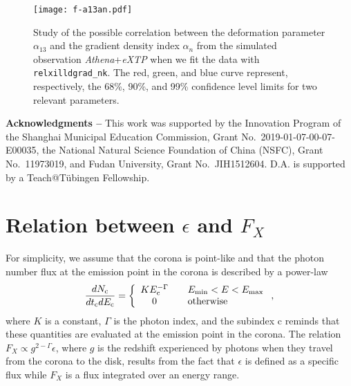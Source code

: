 \documentclass[twocolumn]{emulateapj}
\newcommand{\be}{\begin{eqnarray}}
\newcommand{\ee}{\end{eqnarray}}
\begin{document}
\begin{figure}
\begin{center}
\texttt{[image: f-a13an.pdf]}
\end{center}
\vspace{-0.5cm}
\caption{Study of the possible correlation between the deformation parameter $\alpha_{13}$ and the gradient density index $\alpha_n$ from the simulated observation \textsl{Athena}+\textsl{eXTP} when we fit the data with {\tt relxilldgrad\_nk}. The red, green, and blue curve represent, respectively, the 68\%, 90\%, and 99\% confidence level limits for two relevant parameters.}
\label{a13an}
\end{figure}








\vspace{0.5cm}


{\bf Acknowledgments --}
This work was supported by the Innovation Program of the Shanghai Municipal Education Commission, Grant No.~2019-01-07-00-07-E00035, the National Natural Science Foundation of China (NSFC), Grant No.~11973019, and Fudan University, Grant No.~JIH1512604. D.A. is supported by a Teach@T{\"ubingen} Fellowship.






\appendix

\section{Relation between $\epsilon$ and $F_X$}

For simplicity, we assume that the corona is point-like and that the photon number flux at the emission point in the corona is described by a power-law
\be\label{eq-corona}
\frac{dN_{\rm c}}{dt_{\rm c} dE_{\rm c}} = \left\{
\begin{array}{cl}
K E^{-\Gamma}_{\rm c} & \quad E_{\rm min} < E < E_{\rm max} \\
0 & \quad \text{otherwise}
\end{array} \right. ,
\ee
where $K$ is a constant, $\Gamma$ is the photon index, and the subindex c reminds that these quantities are evaluated at the emission point in the corona. The relation $F_X \propto g^{2-\Gamma} \epsilon$, where $g$ is the redshift experienced by photons when they travel from the corona to the disk, results from the fact that $\epsilon$ is defined as a specific flux while $F_X$ is a flux integrated over an energy range.
\end{document}
